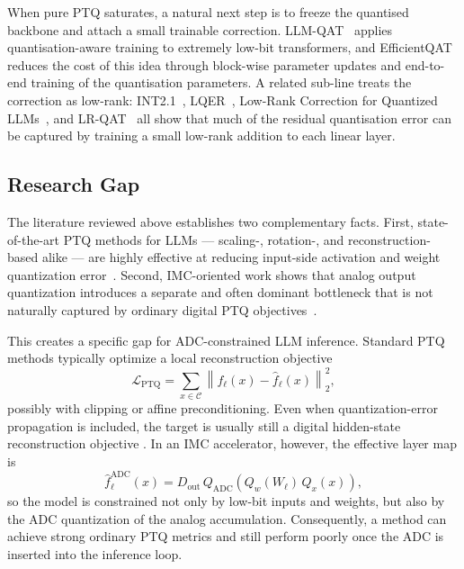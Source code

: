 \documentclass[a4paper,11pt,oneside]{article}
\theoremstyle{breakstyle}
\begin{document}
When pure PTQ saturates, a natural next step is to freeze the
quantised backbone and attach a small trainable correction.
LLM-QAT~\cite{LLMQAT2023} applies quantisation-aware training to
extremely low-bit transformers, and
EfficientQAT~\cite{EfficientQAT2024} reduces the cost of this idea
through block-wise parameter updates and end-to-end training of the
quantisation parameters. A related sub-line treats the correction as
low-rank: INT2.1~\cite{INT21_2023}, LQER~\cite{LQER2024}, Low-Rank
Correction for Quantized LLMs~\cite{LowRankCorrection2024}, and
LR-QAT~\cite{LRQAT2024} all show that much of the residual
quantisation error can be captured by training a small low-rank
addition to each linear layer.

\subsection{Research Gap}
\label{subsec:research_gap}

The literature reviewed above establishes two complementary facts.
First, state-of-the-art PTQ methods for LLMs --- scaling-, rotation-,
and reconstruction-based alike --- are highly effective at reducing
input-side activation and weight quantization
error~\cite{SmoothQuant2022, AWQ2023, OmniQuant2023, QuaRot2024,
SpinQuant2024, FlatQuant2024}.  Second, IMC-oriented work shows that
analog output quantization introduces a separate and often dominant
bottleneck that is not naturally captured by ordinary digital PTQ
objectives~\cite{RAOQ2024, Buechel2025AnalogFoundation}.

This creates a specific gap for ADC-constrained LLM inference. Standard
PTQ methods typically optimize a local reconstruction objective
\begin{equation}
\mathcal{L}_{\mathrm{PTQ}}
=
\sum_{x \in \mathcal{C}}
\left\|
f_\ell(x) - \hat{f}_\ell(x)
\right\|_2^2,
\label{eq:standard_ptq_gap}
\end{equation}
possibly with clipping or affine preconditioning. Even when
quantization-error propagation is included, the target is usually still a
digital hidden-state reconstruction objective \cite{QEP2025}. In an IMC
accelerator, however, the effective layer map is
\begin{equation}
\hat{f}^{\mathrm{ADC}}_\ell(x)
=
D_{\mathrm{out}}
\,
Q_{\mathrm{ADC}}
\!\left(
Q_w(W_\ell)\,Q_x(x)
\right),
\label{eq:adc_layer_gap}
\end{equation}
so the model is constrained not only by low-bit inputs and weights, but
also by the ADC quantization of the analog accumulation. Consequently, a
method can achieve strong ordinary PTQ metrics and still perform poorly
once the ADC is inserted into the inference loop.
\end{document}

